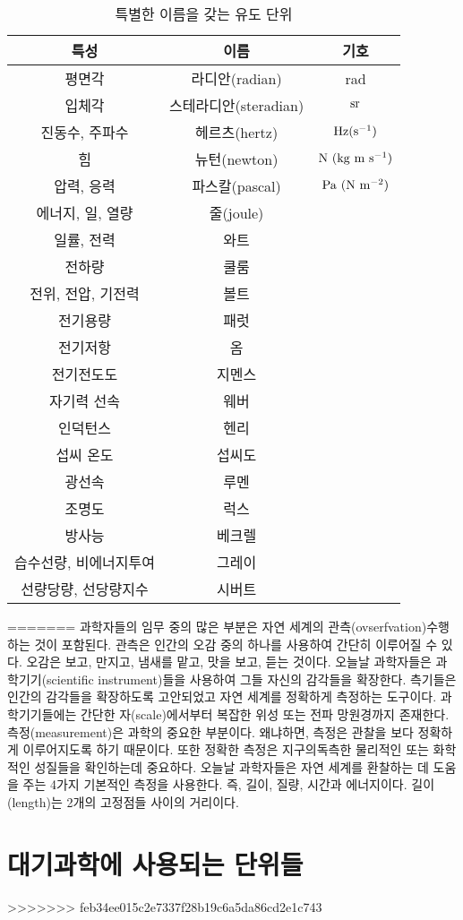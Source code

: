 \begin{table}[h]
	\centering
	\caption{특별한 이름을 갖는 유도 단위}
	\begin{tabular}{c|c|c}
		\hline 
특성	& 이름 & 기호 \\ 	\hline 
평면각	& 라디안(radian) & rad  \\ 	\hline 
입체각	& 스테라디안(steradian) & $\rm sr$ \\  \hline 
진동수, 주파수 & 헤르츠(hertz) & $\rm Hz(s^{-1})$  \\  \hline 
힘 & 뉴턴(newton) & $\rm N~(kg ~ m ~ s^{-1})$ \\  \hline 
압력, 응력 & 파스칼(pascal) & $\rm Pa~(N ~ m^{-2})$  \\  \hline 
에너지, 일, 열량 & 줄(joule) &   \\  \hline 
일률, 전력 & 와트 &  \\  \hline 
전하량 & 쿨룸 &  \\  \hline 
전위, 전압, 기전력 & 볼트 &  \\  \hline 
전기용량 & 패럿 &  \\  \hline 
전기저항& 옴 &  \\  \hline 
전기전도도 & 지멘스 &  \\  \hline 
자기력 선속 & 웨버&  \\  \hline 
인덕턴스 & 헨리 &  \\  \hline 
섭씨 온도 & 섭씨도 &  \\  \hline 
광선속& 루멘 &  \\  \hline 
조명도& 럭스 &  \\  \hline 
방사능 & 베크렐 &  \\  \hline 
습수선량, 비에너지투여 & 그레이 &  \\  \hline 
선량당량, 선당량지수 & 시버트 &  \\  \hline 
	\end{tabular} 
	\label{table:unit02}
\end{table}
=======
과학자들의 임무 중의 많은 부분은 자연 세계의 관측(ovserfvation)\을 수행하는 것이 포함된다. 관측은 인간의 오감 중의 하나를 사용하여 간단히 이루어질 수 있다. 오감은 보고, 만지고, 냄새를 맡고, 맛을 보고, 듣는 것이다. 오늘날 과학자들은 과학기기(scientific instrument)들을 사용하여 그들 자신의 감각들을 확장한다. 측기들은 인간의 감각들을 확장하도록 고안되었고 자연 세계를 정확하게 측정하는 도구이다. 과학기기들에는 간단한 자(scale)에서부터 복잡한 위성 또는 전파 망원경까지 존재한다. 측정(measurement)은 과학의 중요한 부분이다. 왜냐하면, 측정은 관찰을 보다 정확하게 이루어지도록 하기 때문이다.
또한 정확한 측정은 지구의독측한 물리적인 또는 화학적인 성질들을 확인하는데 중요하다. 오늘날 과학자들은 자연 세계를 환찰하는 데 도움을 주는 4가지 기본적인 측정을 사용한다. 즉, 길이, 질량, 시간과 에너지이다. 길이(length)는 2개의 고정점들 사이의 거리이다. 


\section{대기과학에 사용되는 단위들}

>>>>>>> feb34ee015c2e7337f28b19c6a5da86cd2e1c743
